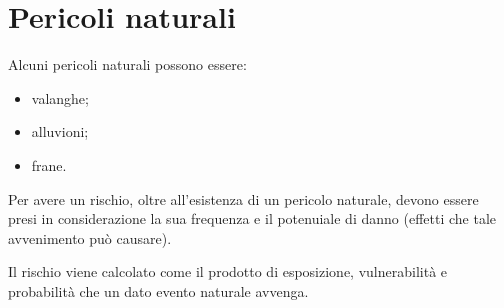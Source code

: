 \documentclass[a4paper]{article}
\begin{document}
\section{Pericoli naturali}


Alcuni pericoli naturali possono essere:
\begin{itemize}
    \item valanghe;
    \item alluvioni;
    \item frane.
\end{itemize}

Per avere un rischio, oltre all'esistenza di un pericolo naturale, devono essere presi
in considerazione la sua frequenza e il potenuiale di danno (effetti che tale
avvenimento può causare).

Il rischio viene calcolato come il prodotto di
esposizione, vulnerabilità e probabilità che un dato evento naturale avvenga.
\end{document}
